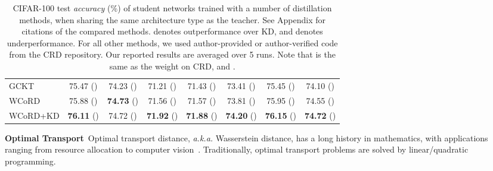 \documentclass[final]{cvpr}
\theoremstyle{definition}
\begin{document}
\begin{table*}[t!]
\begin{center}
\begin{tabular}{lccccccc}
GCKT & 75.47 ()& 74.23 ()& 71.21 ()& 71.43 ()& 73.41 ()& 75.45 ()& 74.10 ()\\

WCoRD & 75.88 ()& \textbf{74.73} ()& 71.56 ()& 71.57 ()& 73.81 ()& 75.95 ()& 74.55 ()\\
                                                      
WCoRD+KD & \textbf{76.11} ()& {74.72} ()& \textbf{71.92} ()& \textbf{71.88} ()& \textbf{74.20} ()& \textbf{76.15} ()& \textbf{74.72} ()\\
\bottomrule
\end{tabular}
\caption{
\small{
CIFAR-100 test \emph{accuracy} (\%) of student networks trained with a number of distillation methods, when sharing the same architecture type as the teacher. See Appendix for citations of the compared methods.  denotes outperformance over KD, and  denotes underperformance. For all other methods, we used author-provided or author-verified code from the CRD repository. Our reported results are averaged over 5 runs. Note that  is the same as the weight on CRD, and .
}}
\label{tb:cifar100_same}
\end{center}
\vspace{-2mm}
\end{table*} 
\begin{table*}[t]
\small


\begin{center}
\caption{
\small{Top-1 and Top-5 error rates (\%) of student network ResNet-18 on ImageNet validation set.}
}
\label{tb:imagenet}
\end{center}
\vspace{-3mm}
\end{table*} 
\vspace{5pt}
\noindent\textbf{Optimal Transport}\,
Optimal transport distance, \emph{a.k.a.} Wasserstein distance, has a long history in mathematics, with applications ranging from resource allocation to computer vision~\cite{rubner1998metric}. Traditionally, optimal transport problems are solved by linear/quadratic programming.
\end{document}
